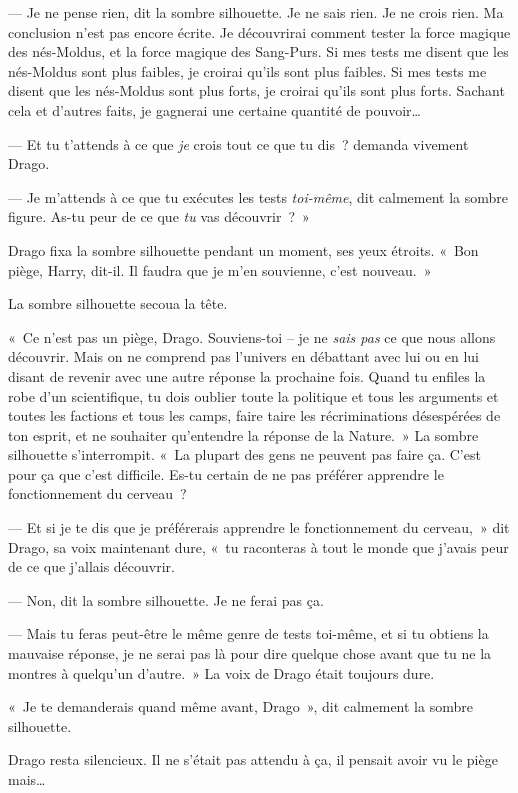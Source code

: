 --- Je ne pense rien, dit la sombre silhouette.
Je ne sais rien.
Je ne crois rien.
Ma conclusion n'est pas encore écrite.
Je découvrirai comment tester la force magique des nés-Moldus, et la force magique des Sang-Purs.
Si mes tests me disent que les nés-Moldus sont plus faibles, je croirai qu'ils sont plus faibles.
Si mes tests me disent que les nés-Moldus sont plus forts, je croirai qu'ils sont plus forts.
Sachant cela et d'autres faits, je gagnerai une certaine quantité de pouvoir…

--- Et tu t'attends à ce que \emph{je} crois tout ce que tu dis~? demanda vivement Drago.

--- Je m'attends à ce que tu exécutes les tests \emph{toi-même}, dit calmement la sombre figure.
As-tu peur de ce que \emph{tu} vas découvrir~?~»

Drago fixa la sombre silhouette pendant un moment, ses yeux étroits.
«~Bon piège, Harry, dit-il.
Il faudra que je m'en souvienne, c'est nouveau.~»

La sombre silhouette secoua la tête.

«~Ce n'est pas un piège, Drago.
Souviens-toi -- je ne \emph{sais pas} ce que nous allons découvrir.
Mais on ne comprend pas l'univers en débattant avec lui ou en lui disant de revenir avec une autre réponse la prochaine fois.
Quand tu enfiles la robe d'un scientifique, tu dois oublier toute la politique et tous les arguments et toutes les factions et tous les camps, faire taire les récriminations désespérées de ton esprit, et ne souhaiter qu'entendre la réponse de la Nature.~»
La sombre silhouette s'interrompit.
«~La plupart des gens ne peuvent pas faire ça.
C'est pour ça que c'est difficile.
Es-tu certain de ne pas préférer apprendre le fonctionnement du cerveau~?

--- Et si je te dis que je préférerais apprendre le fonctionnement du cerveau,~» dit Drago, sa voix maintenant dure, «~tu raconteras à tout le monde que j'avais peur de ce que j'allais découvrir.

--- Non, dit la sombre silhouette.
Je ne ferai pas ça.

--- Mais tu feras peut-être le même genre de tests toi-même, et si tu obtiens la mauvaise réponse, je ne serai pas là pour dire quelque chose avant que tu ne la montres à quelqu'un d'autre.~»
La voix de Drago était toujours dure.

«~Je te demanderais quand même avant, Drago~», dit calmement la sombre silhouette.

Drago resta silencieux.
Il ne s'était pas attendu à ça, il pensait avoir vu le piège mais…

